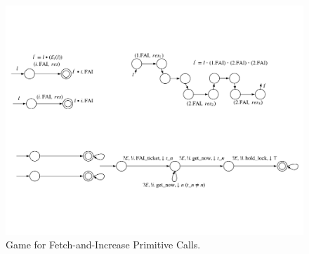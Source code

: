 \begin{figure}
\begin{center}
\includegraphics[scale=.8]{figs/ccal/faiexample}
\end{center}%
\caption{Game for Fetch-and-Increase Primitive Calls.}
\label{fig:chapter:ccal:game-for-fetch-and-increase-primitive-call}
\end{figure}

